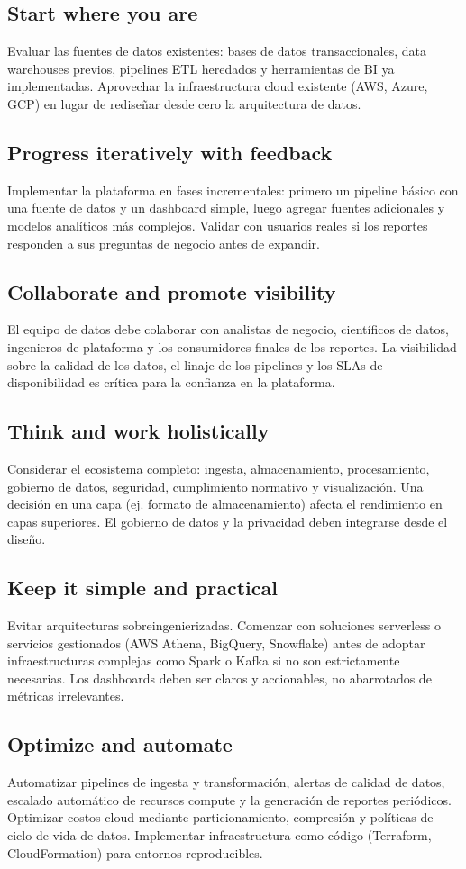\documentclass{article}
\begin{document}
\subsection{Start where you are}
Evaluar las fuentes de datos existentes: bases de datos transaccionales, data warehouses previos, pipelines ETL heredados y herramientas de BI ya implementadas. Aprovechar la infraestructura cloud existente (AWS, Azure, GCP) en lugar de rediseñar desde cero la arquitectura de datos.

\subsection{Progress iteratively with feedback}
Implementar la plataforma en fases incrementales: primero un pipeline básico con una fuente de datos y un dashboard simple, luego agregar fuentes adicionales y modelos analíticos más complejos. Validar con usuarios reales si los reportes responden a sus preguntas de negocio antes de expandir.

\subsection{Collaborate and promote visibility}
El equipo de datos debe colaborar con analistas de negocio, científicos de datos, ingenieros de plataforma y los consumidores finales de los reportes. La visibilidad sobre la calidad de los datos, el linaje de los pipelines y los SLAs de disponibilidad es crítica para la confianza en la plataforma.

\subsection{Think and work holistically}
Considerar el ecosistema completo: ingesta, almacenamiento, procesamiento, gobierno de datos, seguridad, cumplimiento normativo y visualización. Una decisión en una capa (ej. formato de almacenamiento) afecta el rendimiento en capas superiores. El gobierno de datos y la privacidad deben integrarse desde el diseño.

\subsection{Keep it simple and practical}
Evitar arquitecturas sobreingenierizadas. Comenzar con soluciones serverless o servicios gestionados (AWS Athena, BigQuery, Snowflake) antes de adoptar infraestructuras complejas como Spark o Kafka si no son estrictamente necesarias. Los dashboards deben ser claros y accionables, no abarrotados de métricas irrelevantes.

\subsection{Optimize and automate}
Automatizar pipelines de ingesta y transformación, alertas de calidad de datos, escalado automático de recursos compute y la generación de reportes periódicos. Optimizar costos cloud mediante particionamiento, compresión y políticas de ciclo de vida de datos. Implementar infraestructura como código (Terraform, CloudFormation) para entornos reproducibles.
\end{document}
